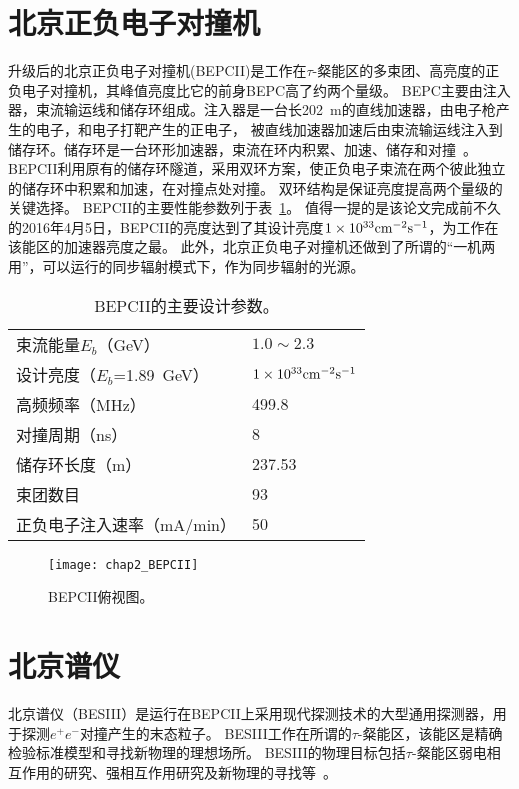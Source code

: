\section{北京正负电子对撞机}
升级后的北京正负电子对撞机(BEPCII)是工作在$\tau$-粲能区的多束团、高亮度的正负电子对撞机，其峰值亮度比它的前身BEPC高了约两个量级。
BEPC主要由注入器，束流输运线和储存环组成。注入器是一台长202\ m的直线加速器，由电子枪产生的电子，和电子打靶产生的正电子，
被直线加速器加速后由束流输运线注入到储存环。储存环是一台环形加速器，束流在环内积累、加速、储存和对撞~\cite{BEPCII}。
BEPCII利用原有的储存环隧道，采用双环方案，使正负电子束流在两个彼此独立的储存环中积累和加速，在对撞点处对撞。
双环结构是保证亮度提高两个量级的关键选择。
BEPCII的主要性能参数列于表~\ref{tab:BEPCII}。
值得一提的是该论文完成前不久的2016年4月5日，BEPCII的亮度达到了其设计亮度$1 \times 10^{33}\rm{cm}^{-2}s^{-1}$，为工作在该能区的加速器亮度之最。
此外，北京正负电子对撞机还做到了所谓的“一机两用”，可以运行的同步辐射模式下，作为同步辐射的光源。
\begin{table}
\centering
\caption{BEPCII的主要设计参数。}
\begin{tabular}{ll}
\toprule
束流能量$E_{b}$（GeV）               &  $1.0\sim2.3$  \\
设计亮度（$E_{b}$=1.89\ GeV）        &  $1 \times 10^{33}\rm{cm}^{-2}s^{-1}$ \\
高频频率（MHz）                      & 499.8 \\
对撞周期（ns）                       & 8 \\
储存环长度（m）                      & 237.53 \\
束团数目                             & 93 \\
正负电子注入速率（mA/min）           & 50 \\
\bottomrule
\end{tabular}
\label{tab:BEPCII}
\end{table}

\begin{figure}
 \centering
 \texttt{[image: chap2\_BEPCII]}
 \caption{BEPCII俯视图。}
 \label{fig:BEPCII}
\end{figure}

\section{北京谱仪}
北京谱仪（BESIII）是运行在BEPCII上采用现代探测技术的大型通用探测器，用于探测$e^{+}e^{-}$对撞产生的末态粒子。
BESIII工作在所谓的$\tau$-粲能区，该能区是精确检验标准模型和寻找新物理的理想场所。
BESIII的物理目标包括$\tau$-粲能区弱电相互作用的研究、强相互作用研究及新物理的寻找等~\cite{Asner:2008nq}。

